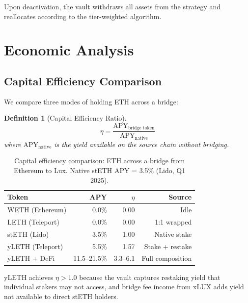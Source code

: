 \documentclass[11pt,twocolumn]{article}
\newtheorem{definition}{Definition}[section]
\begin{document}
Upon deactivation, the vault withdraws all assets from the strategy and reallocates according to the tier-weighted algorithm.

\section{Economic Analysis}\label{sec:economics}

\subsection{Capital Efficiency Comparison}

We compare three modes of holding ETH across a bridge:

\begin{definition}[Capital Efficiency Ratio]
\begin{equation}\label{eq:capital_efficiency}
  \eta = \frac{\text{APY}_{\text{bridge token}}}{\text{APY}_{\text{native}}}
\end{equation}
where $\text{APY}_{\text{native}}$ is the yield available on the source chain without bridging.
\end{definition}

\begin{table}[h]
\centering
\small
\caption{Capital efficiency comparison: ETH across a bridge from Ethereum to Lux. Native stETH APY = 3.5\% (Lido, Q1 2025).}
\label{tab:capital_efficiency}
\begin{tabular}{@{}lrrr@{}}
\toprule
\textbf{Token} & \textbf{APY} & \textbf{$\eta$} & \textbf{Source} \\
\midrule
WETH (Ethereum) & 0.0\% & 0.00 & Idle \\
LETH (Teleport) & 0.0\% & 0.00 & 1:1 wrapped \\
stETH (Lido) & 3.5\% & 1.00 & Native stake \\
yLETH (Teleport) & 5.5\% & 1.57 & Stake + restake \\
yLETH + DeFi & 11.5--21.5\% & 3.3--6.1 & Full composition \\
\bottomrule
\end{tabular}
\end{table}

\noindent
yLETH achieves $\eta > 1.0$ because the vault captures restaking yield that individual stakers may not access, and bridge fee income from xLUX adds yield not available to direct stETH holders.
\end{document}
